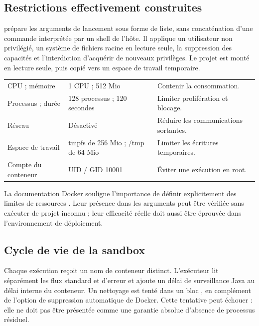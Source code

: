 \subsection{Restrictions effectivement construites}
 prépare les arguments de lancement sous forme de liste, sans concaténation d'une commande interprétée par un shell de l'hôte. Il applique un utilisateur non privilégié, un système de fichiers racine en lecture seule, la suppression des capacités et l'interdiction d'acquérir de nouveaux privilèges. Le projet est monté en lecture seule, puis copié vers un espace de travail temporaire.

\begin{tabularx}{\textwidth}{@{}P{40mm}YP{35mm}@{}}
\toprule
{} &  & \\
\midrule
CPU ; mémoire & 1 CPU ; 512 Mio & Contenir la consommation.\\
Processus ; durée & 128 processus ; 120 secondes & Limiter prolifération et blocage.\\
Réseau & Désactivé & Réduire les communications sortantes.\\
Espace de travail & tmpfs de 256 Mio ; /tmp de 64 Mio & Limiter les écritures temporaires.\\
Compte du conteneur & UID / GID 10001 & Éviter une exécution en root.\\
\bottomrule
\end{tabularx}

\smallskip
La documentation Docker souligne l'importance de définir explicitement des limites de ressources \cite{docker}. Leur présence dans les arguments peut être vérifiée sans exécuter de projet inconnu ; leur efficacité réelle doit aussi être éprouvée dans l'environnement de déploiement.

\clearpage
{}
\subsection{Cycle de vie de la sandbox}
Chaque exécution reçoit un nom de conteneur distinct. L'exécuteur lit séparément les flux standard et d'erreur et ajoute un délai de surveillance Java au délai interne du conteneur. Un nettoyage est tenté dans un bloc , en complément de l'option de suppression automatique de Docker. Cette tentative peut échouer : elle ne doit pas être présentée comme une garantie absolue d'absence de processus résiduel.

